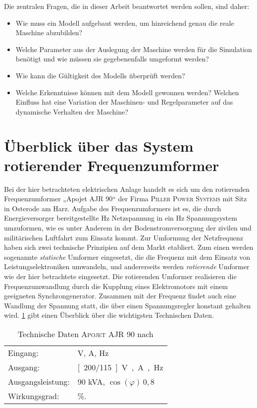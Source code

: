 Die zentralen Fragen, die in dieser Arbeit beantwortet werden sollen, sind daher:
\begin{itemize}
\item Wie muss ein Modell aufgebaut werden, um hinreichend genau die reale Maschine abzubilden?
\item Welche Parameter aus der Auslegung der Maschine werden für die Simulation benötigt und wie müssen sie gegebenenfalls umgeformt werden?
\item Wie kann die Gültigkeit des Modells überprüft werden?
\item Welche Erkenntnisse können mit dem Modell gewonnen werden? Welchen Einfluss hat eine Variation der Maschinen- und Regelparameter auf das dynamische Verhalten der Maschine?
\end{itemize}

\section{Überblick über das System rotierender Frequenzumformer}
\label{sec:Uberblick}
Bei der hier betrachteten elektrischen Anlage handelt es sich um den rotierenden Frequenzumformer „Apojet AJR 90“ der Firma \textsc{Piller Power Systems} mit Sitz in Osterode am Harz. Aufgabe des Frequenzumformers ist es, die durch Energieversorger bereitgestellte \unit[50]{Hz} Netzspannung in ein \unit[400]{Hz} Spannungsystem umzuformen, wie es unter Anderem in der Bodenstromversorgung der zivilen und militärischen Luftfahrt zum Einsatz kommt.
Zur Umformung der Netzfrequenz haben sich zwei technische Prinzipien auf dem Markt etabliert. Zum einen werden sogenannte \emph{statische} Umformer eingesetzt, die die Frequenz mit dem Einsatz von Leistungselektroniken umwandeln, und andererseits werden \emph{rotierende} Umformer wie der hier betrachtete eingesetzt. Die rotierenden Umformer realisieren die Frequenzumwandlung durch die Kupplung eines Elektromotors mit einem geeigneten Synchrongenerator. Zusammen mit der Frequenz findet auch eine Wandlung der Spannung statt, die über einen Spannungsregler konstant gehalten wird. \cref{tab:Leistungsdaten} gibt einen Überblick über die wichtigsten Technischen Daten.
\begin{table}
\caption{Technische Daten \textsc{Apojet AJR 90} nach \cite{pillerpowersystemsBetriebshandbuchAPOJET202021}}\label{tab:Leistungsdaten}
\centering
\begin{tabular}{@{}ll@{}}
\toprule
Eingang:         & \unit[400]{V}, \unit[145]{A}, \unit[50]{Hz}      \\ 
Ausgang:         & \unit[200/115]{V}, \unit[260]{A}, \unit[400]{Hz} \\
Ausgangsleistung:& 90 kVA, $\cos(\varphi)\, 0,8$                    \\
Wirkungsgrad:    & \unit[85]{\%}.                                   \\ \bottomrule
\end{tabular}
\end{table}

